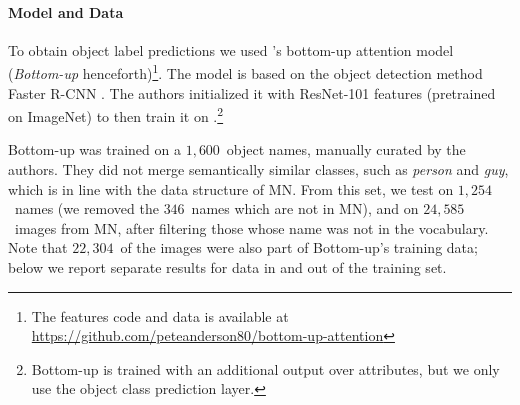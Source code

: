 \paragraph{Model and Data}
To obtain object label predictions we used \citeauthor{anderson2018updown}'s \citeyear{anderson2018updown} bottom-up attention model (\textit{Bottom-up} henceforth)\footnote{The features code and data is available at \url{https://github.com/peteanderson80/bottom-up-attention}}. 
The model is based on the object detection method Faster R-CNN \cite{fasterrcnn2015}. The authors initialized it with ResNet-101 \cite{he2016deep} features (pretrained on ImageNet) to then train it on \vg.\footnote{Bottom-up is trained with an additional output over attributes, but we only use the object class prediction layer.} 
%
\iffalse
"To pretrain the bottom-up attention model, we first initialize Faster R-CNN with ResNet-101 pretrained for classification on ImageNet [35]. We then train on Visual
Genome [21] data. To aid the learning of good feature
representations, we add an additional training output for
predicting attribute classes (in addition to object classes).
To predict attributes for region i, we concatenate the mean
pooled convolutional feature vi with a learned embedding
of the ground-truth object class, and feed this into an additional output layer defining a softmax distribution over each
attribute class plus a ‘no attributes’ class.
The original Faster R-CNN multi-task loss function contains four components, defined over the classification and
bounding box regression outputs for both the RPN and the
final object class proposals respectively. We retain these
components and add an additional multi-class loss component to train the attribute predictor"
\fi

Bottom-up was trained on a $1,600$\ object names, manually curated by the authors. %
They did not merge semantically similar classes, such as \textsl{person} and \textsl{guy}, which is in line with the data structure of MN. %
%
From this set, we test on $1,254$~names (we removed the $346$\ names which are not in MN), and on $24,585$~images from MN, after filtering those whose \vg name was not in the vocabulary. 
Note that $22,304$~of the images were also part of Bottom-up's training data; below we report separate results for data in and out of the training set. 
%
